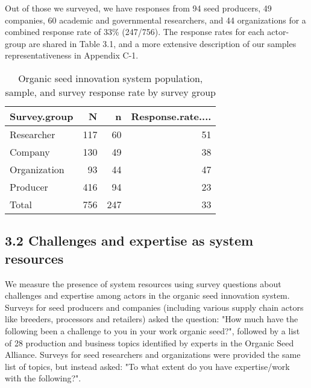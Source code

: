 \documentclass[twoside,12pt,final]{ucthesis-CA2012}
\begin{document}
\begin{ucmainmatter}
Out of those we surveyed, we have responses from 94 seed producers, 49
companies, 60 academic and governmental researchers, and 44
organizations for a combined response rate of 33\% (247/756). The
response rates for each actor-group are shared in Table 3.1, and a more
extensive description of our sample\textquotesingle s representativeness in Appendix
C-1.
\begin{table}

\caption{\label{tab:unnamed-chunk-23}Organic seed innovation system population, sample, and survey response rate by survey group}
\centering
\begin{tabular}[t]{lrrr}
\toprule
Survey.group & N & n & Response.rate....\\
\midrule
Researcher & 117 & 60 & 51\\
Company & 130 & 49 & 38\\
Organization & 93 & 44 & 47\\
Producer & 416 & 94 & 23\\
Total & 756 & 247 & 33\\
\bottomrule
\end{tabular}
\end{table}
\hypertarget{challenges-and-expertise-as-system-resources}{%
\subsection{3.2 Challenges and expertise as system resources}\label{challenges-and-expertise-as-system-resources}}

We measure the presence of system resources using survey questions about
challenges and expertise among actors in the organic seed innovation
system. Surveys for seed producers and companies (including various
supply chain actors like breeders, processors and retailers) asked the
question: "How much have the following been a challenge to you in your
work organic seed?", followed by a list of 28 production and business
topics identified by experts in the Organic Seed Alliance. Surveys for
seed researchers and organizations were provided the same list of
topics, but instead asked: "To what extent do you have expertise/work
with the following?".


\end{ucmainmatter}
\end{document}
